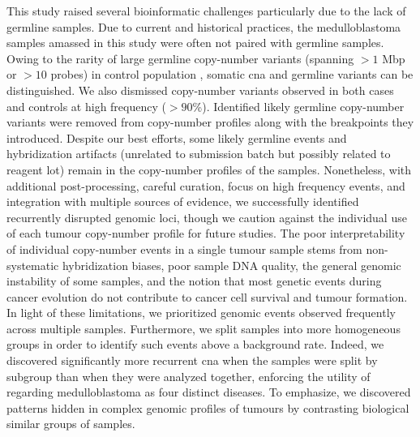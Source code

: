 This study raised several bioinformatic challenges particularly due to the lack of germline samples. Due to current and historical practices, the medulloblastoma samples amassed in this study were often not paired with germline samples. Owing to the rarity of large germline copy-number variants (spanning $> 1$ Mbp or $> 10$ probes) in control population , somatic \gls{cna} and germline variants can be distinguished. We also dismissed copy-number variants observed in both cases and controls at high frequency ($> 90$\%). Identified likely germline copy-number variants were removed from copy-number profiles along with the breakpoints they introduced. Despite our best efforts, some likely germline events and hybridization artifacts (unrelated to submission batch but possibly related to reagent lot) remain in the copy-number profiles of the samples. Nonetheless, with additional post-processing, careful curation, focus on high frequency events, and integration with multiple sources of evidence, we successfully identified recurrently disrupted genomic loci, though we caution against the individual use of each tumour copy-number profile for future studies. The poor interpretability of individual copy-number events in a single tumour sample stems from non-systematic hybridization biases, poor sample DNA quality, the general genomic instability of some samples, and the notion that most genetic events during cancer evolution do not contribute to cancer cell survival and tumour formation. In light of these limitations, we prioritized genomic events observed frequently across multiple samples. Furthermore, we split samples into more homogeneous groups in order to identify such events above a background rate. Indeed, we discovered significantly more recurrent \gls{cna} when the samples were split by subgroup than when they were analyzed together, enforcing the utility of regarding medulloblastoma as four distinct diseases. To emphasize, we discovered patterns hidden in complex genomic profiles of tumours by contrasting biological similar groups of samples.


